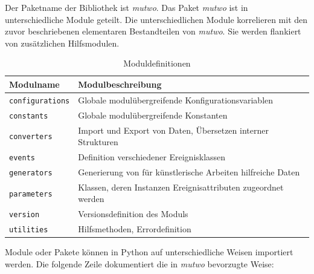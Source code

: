 \documentclass[12pt,a4paper,ngerman]{article}
\begin{document}
\bigskip

Der Paketname der Bibliothek ist \emph{mutwo}.
% 
% 
% 
Das Paket \emph{mutwo} ist in unterschiedliche Module geteilt.
Die unterschiedlichen Module korrelieren mit den zuvor beschriebenen elementaren Bestandteilen von \emph{mutwo}.
Sie werden flankiert von zusätzlichen Hilfsmodulen.

\begin{table}[h!]
    \begin{center}
        \begin{tabular}{l l} 
            \hline
            Modulname & Modulbeschreibung \\ [0.5ex] 
            \hline\hline
            \texttt{configurations} & Globale modulübergreifende Konfigurationsvariablen \\
            \texttt{constants} & Globale modulübergreifende Konstanten \\
            \texttt{converters} & Import und Export von Daten, Übersetzen interner Strukturen \\
            \texttt{events} & Definition verschiedener Ereignisklassen \\
            \texttt{generators} & Generierung von für künstlerische Arbeiten hilfreiche Daten \\
            \texttt{parameters} & Klassen, deren Instanzen Ereignisattributen zugeordnet werden \\
            \texttt{version} & Versionsdefinition des Moduls \\
            \texttt{utilities} & Hilfsmethoden, Errordefinition \\ [1ex] 
            \hline
        \end{tabular}\label{table:modulDefinition}
    \end{center}

    \caption{Moduldefinitionen}
\end{table}

Module oder Pakete können in Python auf unterschiedliche Weisen importiert werden.
Die folgende Zeile dokumentiert die in \emph{mutwo} bevorzugte Weise:
\end{document}
